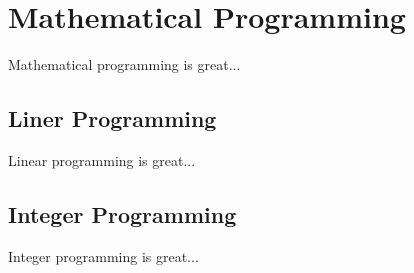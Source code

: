 \documentclass[../main/main.tex]{subfiles}
\begin{document}
\chapter{Mathematical Programming}

Mathematical programming is great... 

\section{Liner Programming}
Linear programming is great... 

\section{Integer Programming}

Integer programming is great... 
\end{document}
